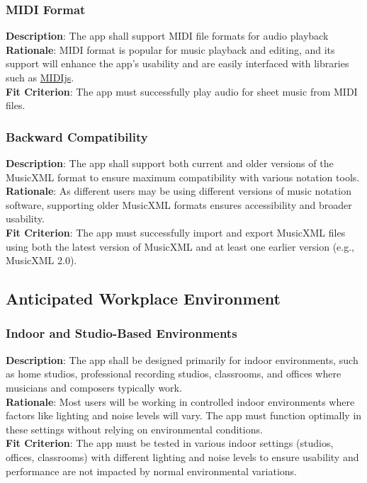 \documentclass[12pt]{article}
\begin{document}
\subsubsection*{MIDI Format}
\textbf{Description}: The app shall support MIDI file formats for audio playback\\
\textbf{Rationale}: MIDI format is popular for music playback and editing, and its support will enhance the app’s usability and are easily interfaced with libraries such as \href{https://www.midijs.net/}{MIDIjs}.\\
\textbf{Fit Criterion}: The app must successfully play audio for sheet music from MIDI files.
\subsubsection*{Backward Compatibility}
\textbf{Description}: The app shall support both current and older versions of the MusicXML format to ensure maximum compatibility with various notation tools.\\
\textbf{Rationale}: As different users may be using different versions of music notation software, supporting older MusicXML formats ensures accessibility and broader usability.\\
\textbf{Fit Criterion}: The app must successfully import and export MusicXML files using both the latest version of MusicXML and at least one earlier version (e.g., MusicXML 2.0).

\subsection{Anticipated Workplace Environment}
\subsubsection*{Indoor and Studio-Based Environments}
\textbf{Description}: The app shall be designed primarily for indoor environments, such as home studios, professional recording studios, classrooms, and offices where musicians and composers typically work.\\
\textbf{Rationale}: Most users will be working in controlled indoor environments where factors like lighting and noise levels will vary. The app must function optimally in these settings without relying on environmental conditions.\\
\textbf{Fit Criterion}: The app must be tested in various indoor settings (studios, offices, classrooms) with different lighting and noise levels to ensure usability and performance are not impacted by normal environmental variations.
\end{document}

